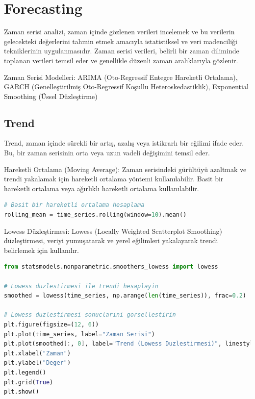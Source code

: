 \section{Forecasting}
Zaman serisi analizi, zaman içinde gözlenen verileri incelemek ve bu verilerin gelecekteki değerlerini tahmin etmek amacıyla istatistiksel ve veri madenciliği tekniklerinin uygulanmasıdır. Zaman serisi verileri, belirli bir zaman diliminde toplanan verileri temsil eder ve genellikle düzenli zaman aralıklarıyla gözlenir.

Zaman Serisi Modelleri: ARIMA (Oto-Regressif Entegre Hareketli Ortalama), GARCH (Genelleştirilmiş Oto-Regressif Koşullu Heteroskedastiklik), Exponential Smoothing (Üssel Düzleştirme)

\subsection{Trend}
Trend, zaman içinde sürekli bir artış, azalış veya istikrarlı bir eğilimi ifade eder. Bu, bir zaman serisinin orta veya uzun vadeli değişimini temsil eder.

Hareketli Ortalama (Moving Average): Zaman serisindeki gürültüyü azaltmak ve trendi yakalamak için hareketli ortalama yöntemi kullanılabilir. Basit bir hareketli ortalama veya ağırlıklı hareketli ortalama kullanılabilir.
\begin{lstlisting}[language=Python]
# Basit bir hareketli ortalama hesaplama
rolling_mean = time_series.rolling(window=10).mean()
\end{lstlisting}

Lowess Düzleştirmesi: Lowess (Locally Weighted Scatterplot Smoothing) düzleştirmesi, veriyi yumuşatarak ve yerel eğilimleri yakalayarak trendi belirlemek için kullanılır.
\begin{lstlisting}[language=Python]
from statsmodels.nonparametric.smoothers_lowess import lowess

# Lowess duzlestirmesi ile trendi hesaplayin
smoothed = lowess(time_series, np.arange(len(time_series)), frac=0.2)

# Lowess duzlestirmesi sonuclarini gorsellestirin
plt.figure(figsize=(12, 6))
plt.plot(time_series, label="Zaman Serisi")
plt.plot(smoothed[:, 0], label="Trend (Lowess Duzlestirmesi)", linestyle="--")
plt.xlabel("Zaman")
plt.ylabel("Deger")
plt.legend()
plt.grid(True)
plt.show()
\end{lstlisting}

\newpage

